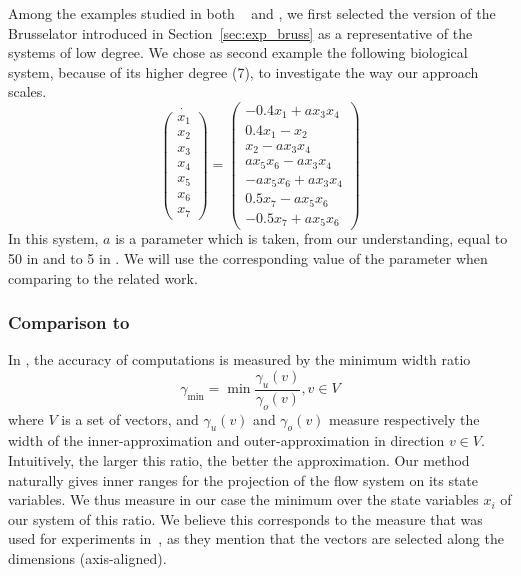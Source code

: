 Among the examples studied in both ~\cite{Underapproxflowpipes} and \cite{underapprox16}, we first selected
the version of the Brusselator introduced in Section~\ref{sec:exp_bruss} as a representative of the systems of low degree. 
We chose as second example the following biological system, because of its higher degree (7), to investigate the way our approach scales. 
\begin{equation}
\dot{\left(\begin{array}{c}
x_1 \\
x_2 \\
x_3 \\
x_4 \\
x_5 \\
x_6 \\
x_7
\end{array}\right)} = \left(\begin{array}{c}
-0.4x_1+ a x_3x_4 \\
0.4x_1-x_2 \\
x_2- a x_3x_4 \\
a x_5x_6- a x_3x_4 \\
- a x_5x_6+ a x_3x_4 \\
0.5x_7- a x_5x_6 \\
-0.5x_7+ a x_5x_6
\end{array}\right)
\end{equation}
In this system, $a$ is a parameter which is taken, from our understanding, equal to 50 in \cite{Underapproxflowpipes} and to 5 in \cite{underapprox16}. 
We will use the corresponding value of the parameter when comparing to the related work.

\subsubsection{Comparison to \cite{Underapproxflowpipes}}
In  \cite{Underapproxflowpipes}, the  accuracy of computations is measured by the minimum width ratio 
\[ \gamma_{\min}=\min{\frac{\gamma_u(v)}{\gamma_o(v)}}, v \in V \]
where $V$ is a set of vectors, and $\gamma_u(v)$ and $\gamma_o(v)$ measure respectively the width of the inner-approximation and outer-approximation
in direction $v \in V$. 
Intuitively, the larger this ratio, the better the approximation. 
Our method naturally gives inner ranges for the projection of the flow system on its state variables. %
We thus measure in our case the minimum over the state variables $x_i$ of our system of this ratio.  %
We believe this corresponds to the measure that was used for experiments 
in~\cite{Underapproxflowpipes}, as they mention that the vectors are selected along the dimensions (axis-aligned).

